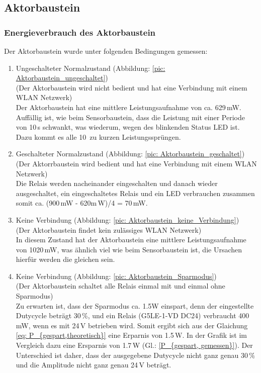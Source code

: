 \subsection{Aktorbaustein}
\subsubsection{Energieverbrauch des Aktorbaustein}
Der Aktorbaustein wurde unter folgenden Bedingungen gemessen:

\begin{enumerate}
	\item Ungeschalteter Normalzustand (Abbildung: \ref{pic: Aktorbaustein_ungeschaltet}) \\(Der Aktorbaustein wird nicht bedient und hat eine Verbindung mit einem WLAN Netzwerk) \\
	Der Aktorbaustein hat eine mittlere Leistungsaufnahme von ca. 629\,mW. Auffällig ist, wie beim Sensorbaustein, dass die Leistung mit einer Periode von 10\,s schwankt, was wiederum, wegen des blinkenden Status LED ist. Dazu kommt es alle 10\, zu kurzen Leistungssprüngen.
	\\
	\item Geschalteter Normalzustand (Abbildung: \ref{pic: Aktorbaustein_geschaltet})\\ (Der Aktorrbaustein wird bedient und hat eine Verbindung mit einem WLAN Netzwerk)\\
	Die Relais werden nacheinander eingeschalten und danach wieder ausgeschaltet, ein eingeschaltetes Relais und ein LED verbrauchen zusammen somit ca. (900\,mW - 620m\,W)/4 = 70\,mW.
	\\
	\item Keine Verbindung (Abbildung: \ref{pic: Aktorbaustein_keine_Verbindung})\\ (Der Aktorbaustein findet kein zulässiges WLAN Netzwerk)\\
	In diesem Zustand hat der Aktorbaustein eine mittlere Leistungsaufnahme von 1020\,mW, was ähnlich viel wie beim Sensorbaustein ist, die Ursachen hierfür werden die gleichen sein.
	\\
	\item Keine Verbindung (Abbildung: \ref{pic: Aktorbaustein_Sparmodus})\\ (Der Aktorbaustein schaltet alle Relais einmal mit und einmal ohne Sparmodus)\\
	Zu erwarten ist, dass der Sparmodus ca. 1.5W einspart, denn der eingestellte Dutycycle beträgt 30\,\%, und ein Relais (G5LE-1-VD DC24) verbraucht 400\,mW, wenn es mit 24\,V betrieben wird. Somit ergibt sich aus der Glaichung \ref{eq: P_{gespart,theoretisch}} eine Erparnis von 1.5\,W. In der Grafik ist im Vergleich dazu eine Ersparnis von 1.7\,W (Gl.:  \ref{P_{gespart, gemessen}}). Der Unterschied ist daher, dass der ausgegebene Dutycycle nicht ganz genau 30\,\% und die Amplitude nicht ganz genau 24\,V beträgt.
\end{enumerate}

